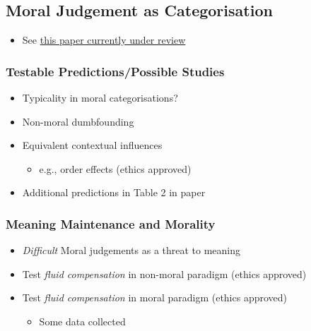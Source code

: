 \documentclass[
]{article}
\providecommand{\tightlist}{%
  \setlength{\itemsep}{0pt}\setlength{\parskip}{0pt}}
\begin{document}
\hypertarget{moral-judgement-as-categorisation}{%
\subsection{Moral Judgement as
Categorisation}\label{moral-judgement-as-categorisation}}

\begin{itemize}
\tightlist
\item
  See \href{https://psyarxiv.com/72dzp/}{\color{blue}this paper
  currently under review\color{black}}
\end{itemize}

\hypertarget{testable-predictionspossible-studies}{%
\subsubsection{Testable Predictions/Possible
Studies}\label{testable-predictionspossible-studies}}

\begin{itemize}
\tightlist
\item
  Typicality in moral categorisations?
\item
  Non-moral dumbfounding
\item
  Equivalent contextual influences

  \begin{itemize}
  \tightlist
  \item
    e.g., order effects (ethics approved)
  \end{itemize}
\item
  Additional predictions in Table 2 in paper
\end{itemize}

\hypertarget{meaning-maintenance-and-morality}{%
\subsubsection{Meaning Maintenance and
Morality}\label{meaning-maintenance-and-morality}}

\begin{itemize}
\tightlist
\item
  \emph{Difficult} Moral judgements as a threat to meaning
\item
  Test \emph{fluid compensation} in non-moral paradigm (ethics approved)
\item
  Test \emph{fluid compensation} in moral paradigm (ethics approved)

  \begin{itemize}
  \tightlist
  \item
    Some data collected
  \end{itemize}
\end{itemize}
\end{document}
